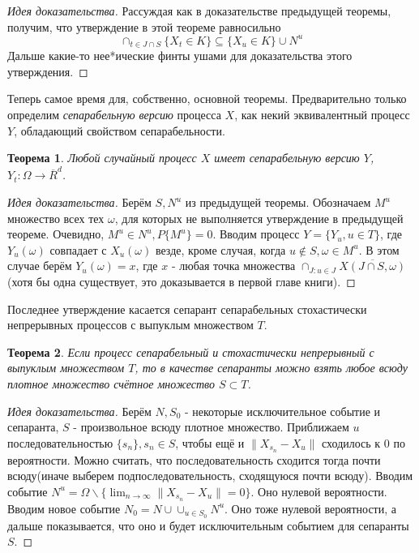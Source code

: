 \documentclass[16pt]{article}
\newtheorem{theorem}{Теорема}[section]
\theoremstyle{definition}
\begin{document}
\begin{proof}[Идея доказательства]
Рассуждая как в доказательстве предыдущей теоремы, получим, что утверждение в этой теореме равносильно $$\cap_{t \in J \cap S}\{X_t \in K\} \subseteq \{X_u \in K\} \cup N^u$$ Дальше какие-то нее*ические финты ушами для доказательства этого утверждения.
\end{proof}
Теперь самое время для, собственно, основной теоремы. Предварительно только определим \textit{сепарабельную версию} процесса $X$, как некий эквивалентный процесс $Y$, обладающий свойством сепарабельности.
\begin{theorem}
Любой случайный процесс $X$ имеет сепарабельную версию $Y$, $Y_t:\Omega \rightarrow \overline{R}^d$.
\end{theorem}
\begin{proof}[Идея доказательства]
Берём $S, N^u$ из предыдущей теоремы. Обозначаем $M^u$ множество всех тех $\omega$, для которых не выполняется утверждение в предыдущей теореме. Очевидно, $M^u \in N^u, P\{M^u\} = 0$. Вводим процесс $Y = \{Y_u, u \in T\}$, где $Y_u(\omega)$ совпадает с $X_u(\omega)$ везде, кроме случая, когда $u \notin S, \omega \in M^u$. В этом случае берём $Y_u(\omega) = x$, где $x$ - любая точка множества $\cap_{J: u \in J} \overline{X(J \cap S, \omega)}$ (хотя бы одна существует, это доказывается в первой главе книги).
\end{proof}
Последнее утверждение касается сепарант сепарабельных стохастически непрерывных процессов с выпуклым множеством $T$.
\begin{theorem}
Если процесс сепарабельный и стохастически непрерывный с выпуклым множеством $T$, то в качестве сепаранты можно взять любое всюду плотное множество счётное множество $S \subset T$.
\end{theorem}
\begin{proof}[Идея доказательства]
Берём $N, S_0$ - некоторые исключительное событие и сепаранта, $S$ - произвольное всюду плотное множество. Приближаем $u$ последовательностью $\{s_n\}, s_n \in S$, чтобы ещё и $\|X_{s_n} -X_u\|$ сходилось к $0$ по вероятности. Можно считать, что последовательность сходится тогда почти всюду(иначе выберем подпоследовательность, сходящуюся почти всюду). Вводим событие $N^u = \Omega \backslash \{\lim_{n \rightarrow \infty}\|X_{s_n} - X_u\| = 0\}$. Оно нулевой вероятности. Вводим новое событие $N_0 = N \cup \cup_{u \in S_0}N^u$. Оно тоже нулевой вероятности, а дальше показывается, что оно и будет исключительным событием для сепаранты $S$.
\end{proof}
\end{document}
